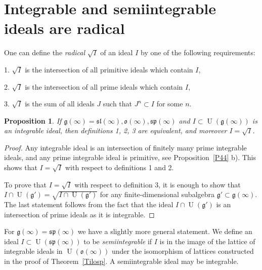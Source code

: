 \documentclass{emsprocart}
\newtheorem{proposition}[theorem]{Proposition}
\begin{document}
\section{Integrable and semiintegrable ideals are radical}
One can define the {\it radical} $\sqrt I$ of an ideal $I$ by one of the following requirements:

1. $\sqrt I$ is the intersection of all primitive ideals which contain $I$,

2. $\sqrt I$ is the intersection of all prime ideals which contain $I$,

3. $\sqrt I$ is the sum of all ideals $J$ such that $J^n\subset I$ for some $n$.
\begin{proposition}\label{P2}If $\mathfrak g(\infty)=\mathfrak{sl}(\infty), \mathfrak o(\infty), \mathfrak{sp}(\infty)$ and $I\subset\operatorname{U}(\mathfrak g(\infty))$ is an integrable ideal, then definitions 1, 2, 3 are equivalent, and moreover $I=\sqrt I$.\end{proposition}
\begin{proof}Any integrable ideal is an intersection of finitely many prime integrable ideals, and any prime integrable ideal is primitive, see Proposition~\ref{P44} b). This shows that $I=\sqrt I$ with respect to definitions 1 and 2.

To prove that $I=\sqrt I$ with respect to definition 3, it is enough to show that $I\cap\operatorname{U}(\mathfrak g')=\sqrt{I\cap\operatorname{U}(\mathfrak g')}$ for any finite-dimensional subalgebra $\mathfrak g'\subset\mathfrak g(\infty)$. The last statement follows from the fact that the ideal $I\cap\operatorname{U}(\mathfrak g')$ is an intersection of prime ideals as it is integrable.\end{proof}
For $\mathfrak g(\infty)=\mathfrak{sp}(\infty)$ we have a slightly more general statement. We define an ideal $I\subset\operatorname{U}(\mathfrak{sp}(\infty))$ to be {\it semiintegrable} if $I$ is in the image of the lattice of integrable ideals in $\operatorname{U}(\mathfrak o(\infty))$ under the isomorphism of lattices constructed in the proof of Theorem~\ref{Tilosp}. %
A semiintegrable ideal may be integrable.
\end{document}
